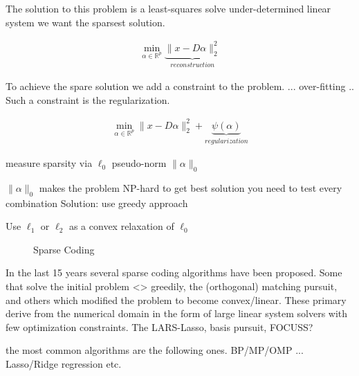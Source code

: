 The solution to this problem is a least-squares solve under-determined linear system we want the sparsest solution.


\begin{align}
\min_{\alpha\in\mathbb{R}^{p}} \underbrace{\lVert x - D\alpha \rVert^{2}_{2}}_{reconstruction}
\end{align}

To achieve the spare solution we add a constraint to the problem. ... over-fitting .. Such a constraint is the regularization.

\begin{align}
\min_{\alpha\in\mathbb{R}^{p}} \lVert x - D\alpha \rVert^{2}_{2} + \underbrace{\psi(\alpha)}_{regularization}
\end{align}


measure sparsity via        $\ell_0$ pseudo-norm       $\lVert\alpha\rVert_{0}$


$\lVert\alpha\rVert_{0}$ makes the problem NP-hard
to get best solution you need to test every combination
Solution:
use greedy approach 


Use $\ell_1$ or $\ell_2$ as a convex relaxation of $\ell_0$


\begin{figure}
\centering
\caption{Sparse Coding}
\label{fig:da_x}
\end{figure}


In the last 15 years several sparse coding algorithms have been proposed. 
Some that solve the initial problem <> greedily, the (orthogonal) matching pursuit, and others which modified the problem to become convex/linear. These primary derive from the numerical domain in the form of 
large linear system solvers with few optimization constraints. The LARS-Lasso, basis pursuit, FOCUSS?

the most common algorithms are the following ones.
BP/MP/OMP ...
Lasso/Ridge regression etc.




